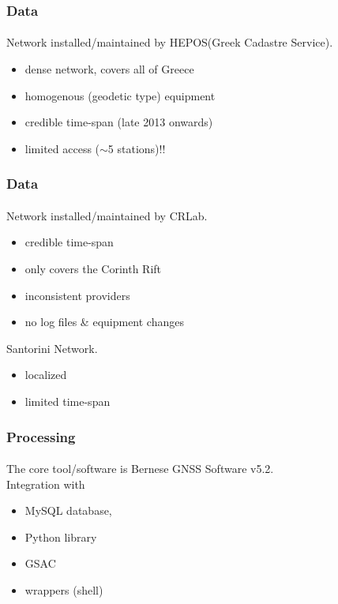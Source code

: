 \documentclass{beamer}
\begin{document}
\begin{frame}\frametitle{Data}\framesubtitle{}
  Network installed/maintained by HEPOS\footnotemark (Greek Cadastre Service). 
  \begin{itemize}
    \item<pro@1-> dense network, covers all of Greece
    \item<pro@1-> homogenous (geodetic type) equipment
    \item<con@1-> credible time-span (late 2013 onwards)
    \item<con@1-> limited access ($\sim$5 stations)!!
  \end{itemize}
\end{frame}

\begin{frame}\frametitle{Data}\framesubtitle{}
  Network installed/maintained by CRLab\footnotemark. 
  \begin{itemize}
    \item<pro@1-> credible time-span
    \item<pro@1-> only covers the Corinth Rift
    \item<con@1-> inconsistent providers
    \item<con@1-> no log files \& equipment changes
  \end{itemize}

  Santorini Network. 
  \begin{itemize}
    \item<con@1-> localized
    \item<con@1-> limited time-span
  \end{itemize}

\end{frame}

\begin{frame}\frametitle{Processing}\framesubtitle{}
  The core tool/software is Bernese GNSS Software v5.2\cite{bernese}.\\
  \medskip
  Integration with 
  \begin{itemize}
    \item MySQL database,
    \item Python library
    \item GSAC
    \item wrappers (shell)
  \end{itemize}
\end{frame}
\end{document}

